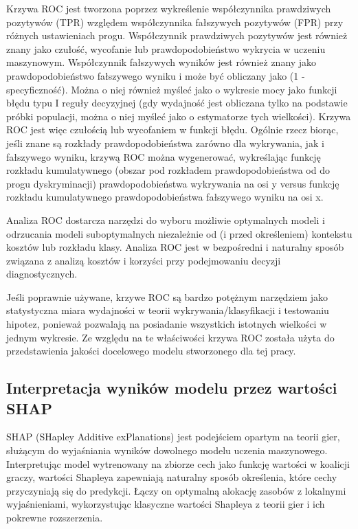 \documentclass[polish, twoside, 12pt, a4paper]{article}
\theoremstyle{definition}
\theoremstyle{plain}
\theoremstyle{remark}
\begin{document}
Krzywa ROC jest tworzona poprzez wykreślenie współczynnika prawdziwych pozytywów (TPR) względem współczynnika fałszywych pozytywów (FPR) przy różnych ustawieniach progu. Współczynnik prawdziwych pozytywów jest również znany jako czułość, wycofanie lub prawdopodobieństwo wykrycia w uczeniu maszynowym. Współczynnik fałszywych wyników jest również znany jako prawdopodobieństwo fałszywego wyniku i może być obliczany jako (1 - specyficzność). Można o niej również myśleć jako o wykresie mocy jako funkcji błędu typu I reguły decyzyjnej (gdy wydajność jest obliczana tylko na podstawie próbki populacji, można o niej myśleć jako o estymatorze tych wielkości). Krzywa ROC jest więc czułością lub wycofaniem w funkcji błędu. Ogólnie rzecz biorąc, jeśli znane są rozkłady prawdopodobieństwa zarówno dla wykrywania, jak i fałszywego wyniku, krzywą ROC można wygenerować, wykreślając funkcję rozkładu kumulatywnego (obszar pod rozkładem prawdopodobieństwa od do progu dyskryminacji) prawdopodobieństwa wykrywania na osi y versus funkcję rozkładu kumulatywnego prawdopodobieństwa fałszywego wyniku na osi x.

Analiza ROC dostarcza narzędzi do wyboru możliwie optymalnych modeli i odrzucania modeli suboptymalnych niezależnie od (i przed określeniem) kontekstu kosztów lub rozkładu klasy. Analiza ROC jest w bezpośredni i naturalny sposób związana z analizą kosztów i korzyści przy podejmowaniu decyzji diagnostycznych.\cite{fawcett2005}

Jeśli poprawnie używane, krzywe ROC są bardzo potężnym narzędziem jako statystyczna miara wydajności w teorii wykrywania/klasyfikacji i testowaniu hipotez, ponieważ pozwalają na posiadanie wszystkich istotnych wielkości w jednym wykresie. Ze względu na te właściwości krzywa ROC została użyta do przedstawienia jakości docelowego modelu stworzonego dla tej pracy.

\subsection{Interpretacja wyników modelu przez wartości SHAP}

SHAP (SHapley Additive exPlanations) jest podejściem opartym na teorii gier, służącym do wyjaśniania wyników dowolnego modelu uczenia maszynowego. Interpretując model wytrenowany na zbiorze cech jako funkcję wartości w koalicji graczy, wartości Shapleya zapewniają naturalny sposób określenia, które cechy przyczyniają się do predykcji. Łączy on optymalną alokację zasobów z lokalnymi wyjaśnieniami, wykorzystując klasyczne wartości Shapleya z teorii gier i ich pokrewne rozszerzenia.
\end{document}
